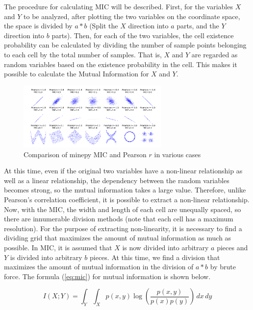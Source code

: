\documentclass[review]{elsarticle}
\begin{document}
The procedure for calculating MIC will be described. First, for the variables \(X\) and \(Y\) to be analyzed, after plotting the two variables on the coordinate space, the space is divided by \(a * b\) (Split the \(X\) direction into \(a\) parts, and the \(Y\) direction into \(b\) parts). Then, for each of the two variables, the cell existence probability can be calculated by dividing the number of sample points belonging to each cell by the total number of samples. That is, \(X\) and \(Y\) are regarded as random variables based on the existence probability in the cell. This makes it possible to calculate the Mutual Information for \(X\) and \(Y\).

\begin{figure}[bh]
\centering
\includegraphics[width=20em]{MIC_pearson_relationships.png}
\caption{Comparison of minepy MIC and Pearson \(r\) in various cases}
\label{fig:mic}
\end{figure}

At this time, even if the original two variables have a non-linear relationship as well as a linear relationship, the dependency between the random variables becomes strong, so the mutual information takes a large value. Therefore, unlike Pearson's correlation coefficient, it is possible to extract a non-linear relationship. Now, with the MIC, the width and length of each cell are unequally spaced, so there are innumerable division methods (note that each cell has a maximum resolution). For the purpose of extracting non-linearity, it is necessary to find a dividing grid that maximizes the amount of mutual information as much as possible. In MIC, it is assumed that \(X\) is now divided into arbitrary \(a\) pieces and \(Y\) is divided into arbitrary \(b\) pieces. At this time, we find a division that maximizes the amount of mutual information in the division of \(a * b\) by brute force. The formula (\ref{eq:mic}) for mutual information is shown below.

\begin{equation}\label{eq:mic}
I(X;Y) = \int_{Y}{\int_{X}{p(x,y)\log(\frac{p(x,y)}{p(x)p(y)})}\,dx}\,dy
\end{equation}
\end{document}
